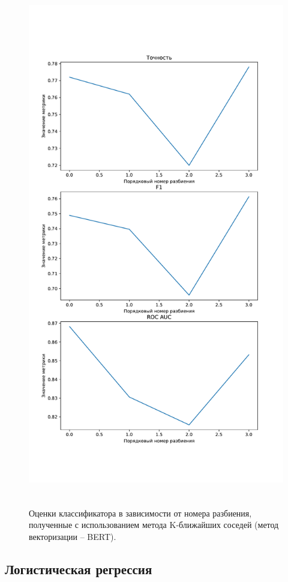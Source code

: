 \begin{figure}[H]
	\centering
	\includegraphics[height=23cm]{inc/plots/knnMetricsBert.pdf}
	\caption{ Оценки классификатора в зависимости от номера разбиения, полученные с использованием метода K-ближайших соседей (метод векторизации -- BERT). }
	\label{img:knnMetricsBert}
\end{figure}



\subsection{Логистическая регрессия}

